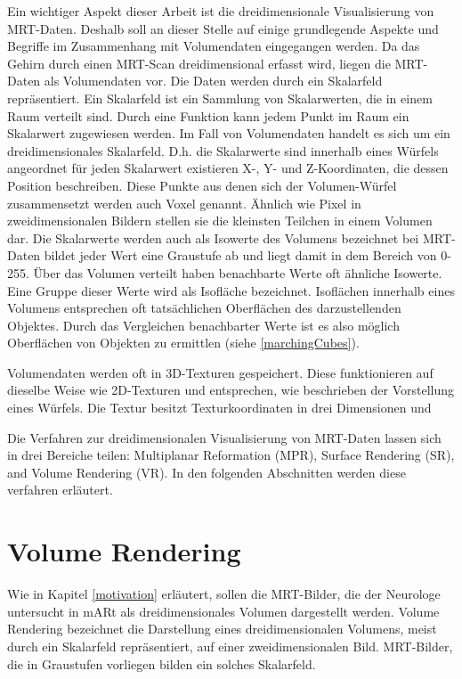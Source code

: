 Ein wichtiger Aspekt dieser Arbeit ist die dreidimensionale Visualisierung von MRT-Daten. Deshalb soll an dieser Stelle auf einige grundlegende Aspekte und Begriffe im Zusammenhang mit Volumendaten eingegangen werden. Da das Gehirn durch einen MRT-Scan dreidimensional erfasst wird, liegen die MRT-Daten als Volumendaten vor. Die Daten werden durch ein Skalarfeld repräsentiert. Ein Skalarfeld ist ein Sammlung von Skalarwerten, die in einem Raum verteilt sind. Durch eine Funktion kann jedem Punkt im Raum ein Skalarwert zugewiesen werden. Im Fall von Volumendaten handelt es sich um ein dreidimensionales Skalarfeld. D.h. die Skalarwerte sind innerhalb eines Würfels angeordnet für jeden Skalarwert existieren X-, Y- und Z-Koordinaten, die dessen Position beschreiben. 
Diese Punkte aus denen sich der Volumen-Würfel zusammensetzt werden auch Voxel genannt. Ähnlich wie Pixel in zweidimensionalen Bildern stellen sie die kleinsten Teilchen in einem Volumen dar. 
Die Skalarwerte werden auch als Isowerte des Volumens bezeichnet bei MRT-Daten bildet jeder Wert eine Graustufe ab und liegt damit in dem Bereich von 0-255. 
Über das Volumen verteilt haben benachbarte Werte oft ähnliche Isowerte. Eine Gruppe dieser Werte wird als Isofläche bezeichnet. Isoflächen innerhalb eines Volumens entsprechen oft tatsächlichen Oberflächen des darzustellenden Objektes. Durch das Vergleichen benachbarter Werte ist es also möglich Oberflächen von Objekten zu ermittlen (siehe \ref{marchingCubes}). 

Volumendaten werden oft in 3D-Texturen gespeichert. Diese funktionieren auf dieselbe Weise wie 2D-Texturen und entsprechen, wie beschrieben der Vorstellung eines Würfels. Die Textur besitzt Texturkoordinaten in drei Dimensionen und 

Die Verfahren zur dreidimensionalen Visualisierung von MRT-Daten lassen sich in drei Bereiche teilen: Multiplanar Reformation (MPR), Surface Rendering (SR), and Volume Rendering (VR). \cite{Zhang10} In den folgenden Abschnitten werden diese verfahren erläutert.

\section{Volume Rendering}							  %
Wie in Kapitel \ref{motivation} erläutert, sollen die MRT-Bilder, die der Neurologe untersucht in mARt als dreidimensionales Volumen dargestellt werden. Volume Rendering bezeichnet die Darstellung eines dreidimensionalen Volumens, meist durch ein Skalarfeld repräsentiert, auf einer zweidimensionalen Bild. MRT-Bilder, die in Graustufen vorliegen bilden ein solches Skalarfeld. 


